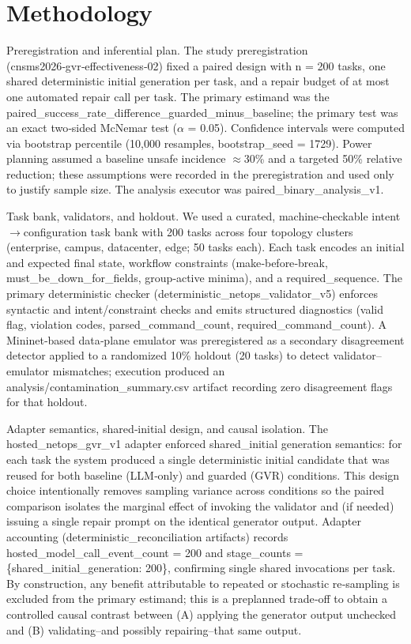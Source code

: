 \documentclass[conference]{IEEEtran}
\begin{document}
\section{Methodology}
Preregistration and inferential plan. The study preregistration (cnsms2026‑gvr‑effectiveness‑02) fixed a paired design with n = 200 tasks, one shared deterministic initial generation per task, and a repair budget of at most one automated repair call per task. The primary estimand was the paired\_success\_rate\_difference\_guarded\_minus\_baseline; the primary test was an exact two‑sided McNemar test (\ensuremath{\alpha} = 0.05). Confidence intervals were computed via bootstrap percentile (10,000 resamples, bootstrap\_seed = 1729). Power planning assumed a baseline unsafe incidence \ensuremath{\approx}30\% and a targeted 50\% relative reduction; these assumptions were recorded in the preregistration and used only to justify sample size. The analysis executor was paired\_binary\_analysis\_v1.

Task bank, validators, and holdout. We used a curated, machine‑checkable intent\ensuremath{\rightarrow}configuration task bank with 200 tasks across four topology clusters (enterprise, campus, datacenter, edge; 50 tasks each). Each task encodes an initial and expected final state, workflow constraints (make‑before‑break, must\_be\_down\_for\_fields, group‑active minima), and a required\_sequence. The primary deterministic checker (deterministic\_netops\_validator\_v5) enforces syntactic and intent/constraint checks and emits structured diagnostics (valid flag, violation codes, parsed\_command\_count, required\_command\_count). A Mininet‑based data‑plane emulator was preregistered as a secondary disagreement detector applied to a randomized 10\% holdout (20 tasks) to detect validator--emulator mismatches; execution produced an analysis/contamination\_summary.csv artifact recording zero disagreement flags for that holdout.

Adapter semantics, shared‑initial design, and causal isolation. The hosted\_netops\_gvr\_v1 adapter enforced shared\_initial generation semantics: for each task the system produced a single deterministic initial candidate that was reused for both baseline (LLM‑only) and guarded (GVR) conditions. This design choice intentionally removes sampling variance across conditions so the paired comparison isolates the marginal effect of invoking the validator and (if needed) issuing a single repair prompt on the identical generator output. Adapter accounting (deterministic\_reconciliation artifacts) records hosted\_model\_call\_event\_count = 200 and stage\_counts = \{shared\_initial\_generation: 200\}, confirming single shared invocations per task. By construction, any benefit attributable to repeated or stochastic re‑sampling is excluded from the primary estimand; this is a preplanned trade‑off to obtain a controlled causal contrast between (A) applying the generator output unchecked and (B) validating--and possibly repairing--that same output.
\end{document}
